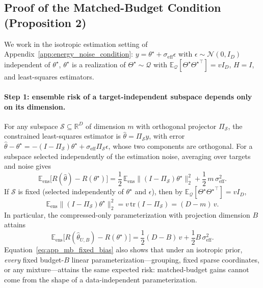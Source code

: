 \subsection{Proof of the Matched-Budget Condition (Proposition 2)}
\label{app:matched_budget}

We work in the isotropic estimation setting of Appendix~\ref{app:energy_noise_condition}: $y=\theta^\star+\sigma_{\mathrm{eff}}\epsilon$ with $\epsilon\sim\mathcal{N}(0,I_D)$ independent of $\theta^\star$, $\theta^\star$ is a realization of $\Theta^\star\sim\mathcal Q$ with $\mathbb E_{\mathcal Q}[\Theta^\star{\Theta^\star}^\top]=vI_D$, $H=I$, and least-squares estimators.

\paragraph{Step 1: ensemble risk of a target-independent subspace depends only on its dimension.}
For any subspace $\mathcal{S}\subseteq\mathbb{R}^D$ of dimension $m$ with orthogonal projector $\Pi_{\mathcal{S}}$, the constrained least-squares estimator is $\hat{\theta}=\Pi_{\mathcal{S}}y$, with error
$\hat{\theta}-\theta^\star=-(I-\Pi_{\mathcal{S}})\theta^\star+\sigma_{\mathrm{eff}}\Pi_{\mathcal{S}}\epsilon$,
whose two components are orthogonal. For a subspace selected independently of the estimation noise, averaging over targets and noise gives
\begin{equation}
\mathbb E_{\mathrm{ens}}\big[R(\hat{\theta})-R(\theta^\star)\big]
=
\frac{1}{2}\,\mathbb E_{\mathrm{ens}}\big\|(I-\Pi_{\mathcal{S}})\theta^\star\big\|_2^2
+
\frac{1}{2}\,m\,\sigma_{\mathrm{eff}}^2 .
\label{eq:app_mb_generic_risk}
\end{equation}
If $\mathcal{S}$ is fixed (selected independently of $\theta^\star$ and $\epsilon$), then by $\mathbb E_{\mathcal Q}[\Theta^\star{\Theta^\star}^\top]=vI_D$,
\begin{equation}
\mathbb E_{\mathrm{ens}}\big\|(I-\Pi_{\mathcal{S}})\theta^\star\big\|_2^2
=
v\,\mathrm{tr}(I-\Pi_{\mathcal{S}})
=
(D-m)\,v .
\label{eq:app_mb_fixed_bias}
\end{equation}
In particular, the compressed-only parameterization with projection dimension $B$ attains
\begin{equation}
\mathbb E_{\mathrm{ens}}\big[R(\hat{\theta}_{U,B})-R(\theta^\star)\big]
=
\frac{1}{2}(D-B)\,v+\frac{1}{2}B\,\sigma_{\mathrm{eff}}^2 .
\label{eq:app_mb_compressed_risk}
\end{equation}
Equation~\eqref{eq:app_mb_fixed_bias} also shows that under an isotropic prior, \emph{every} fixed budget-$B$ linear parameterization---grouping, fixed sparse coordinates, or any mixture---attains the same expected risk: matched-budget gains cannot come from the shape of a data-independent parameterization.

